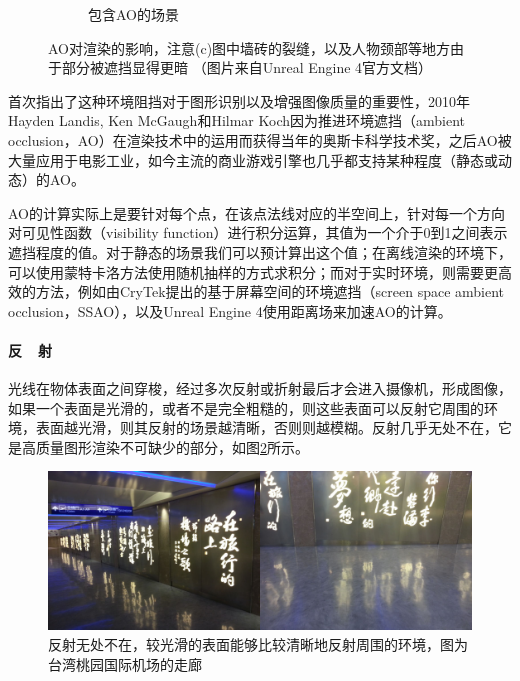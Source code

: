 \begin{figure}
\begin{fullwidth}
\begin{subfigure}[b]{0.325\thewidth}
		\caption{包含AO的场景}
	\end{subfigure}
\caption{AO对渲染的影响，注意(c)图中墙砖的裂缝，以及人物颈部等地方由于部分被遮挡显得更暗 （图片来自Unreal Engine 4官方文档）}
\label{f:intro-ao}
\end{fullwidth}
\end{figure}

\cite{a:Shape-from-shadingonacloudyday}首次指出了这种环境阻挡对于图形识别以及增强图像质量的重要性，2010年Hayden Landis, Ken McGaugh和Hilmar Koch因为推进环境遮挡（ambient occlusion，AO）在渲染技术中的运用而获得当年的奥斯卡科学技术奖，之后AO被大量应用于电影工业，如今主流的商业游戏引擎也几乎都支持某种程度（静态或动态）的AO。

AO的计算实际上是要针对每个点，在该点法线对应的半空间上，针对每一个方向对可见性函数（visibility function）进行积分运算，其值为一个介于0到1之间表示遮挡程度的值。对于静态的场景我们可以预计算出这个值；在离线渲染的环境下，可以使用蒙特卡洛方法使用随机抽样的方式求积分\cite{a:GlobalIlluminationandAllThat}；而对于实时环境，则需要更高效的方法，例如由CryTek提出的基于屏幕空间的环境遮挡（screen space ambient occlusion，SSAO），以及Unreal Engine 4使用距离场来加速AO的计算。




\paragraph{反~~射}
光线在物体表面之间穿梭，经过多次反射或折射最后才会进入摄像机，形成图像，如果一个表面是光滑的，或者不是完全粗糙的，则这些表面可以反射它周围的环境，表面越光滑，则其反射的场景越清晰，否则则越模糊。反射几乎无处不在，它是高质量图形渲染不可缺少的部分，如图\ref{f:intro-reflection-1}所示。

\begin{figure}
\includegraphics[width=1.\textwidth]{figures/intro/reflection}	
\caption{反射无处不在，较光滑的表面能够比较清晰地反射周围的环境，图为台湾桃园国际机场的走廊}
\label{f:intro-reflection-1}
\end{figure}


